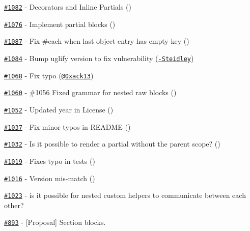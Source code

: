 \begin{DoxyItemize}
\item \href{https://github.com/wycats/handlebars.js/pull/1082}{\tt \#1082} -\/ Decorators and Inline Partials (\href{https://api.github.com/users/kpdecker}{\tt })
\item \href{https://github.com/wycats/handlebars.js/pull/1076}{\tt \#1076} -\/ Implement partial blocks (\href{https://api.github.com/users/kpdecker}{\tt })
\item \href{https://github.com/wycats/handlebars.js/pull/1087}{\tt \#1087} -\/ Fix \#each when last object entry has empty key (\href{https://api.github.com/users/denniskuczynski}{\tt })
\item \href{https://github.com/wycats/handlebars.js/pull/1084}{\tt \#1084} -\/ Bump uglify version to fix vulnerability (\href{https://api.github.com/users/John-Steidley}{\tt -\/\+Steidley})
\item \href{https://github.com/wycats/handlebars.js/pull/1068}{\tt \#1068} -\/ Fix typo (\href{https://api.github.com/users/0xack13}{\tt @0xack13})
\item \href{https://github.com/wycats/handlebars.js/pull/1060}{\tt \#1060} -\/ \#1056 Fixed grammar for nested raw blocks (\href{https://api.github.com/users/ericbn}{\tt })
\item \href{https://github.com/wycats/handlebars.js/pull/1052}{\tt \#1052} -\/ Updated year in License (\href{https://api.github.com/users/maqnouch}{\tt })
\item \href{https://github.com/wycats/handlebars.js/pull/1037}{\tt \#1037} -\/ Fix minor typos in R\+E\+A\+D\+ME (\href{https://api.github.com/users/tomxtobin}{\tt })
\item \href{https://github.com/wycats/handlebars.js/issues/1032}{\tt \#1032} -\/ Is it possible to render a partial without the parent scope? (\href{https://api.github.com/users/aputinski}{\tt })
\item \href{https://github.com/wycats/handlebars.js/pull/1019}{\tt \#1019} -\/ Fixes typo in tests (\href{https://api.github.com/users/aymerick}{\tt })
\item \href{https://github.com/wycats/handlebars.js/issues/1016}{\tt \#1016} -\/ Version mis-\/match (\href{https://api.github.com/users/mayankdedhia}{\tt })
\item \href{https://github.com/wycats/handlebars.js/issues/1023}{\tt \#1023} -\/ is it possible for nested custom helpers to communicate between each other?
\item \href{https://github.com/wycats/handlebars.js/issues/893}{\tt \#893} -\/ \mbox{[}Proposal\mbox{]} Section blocks.

\end{DoxyItemize}
